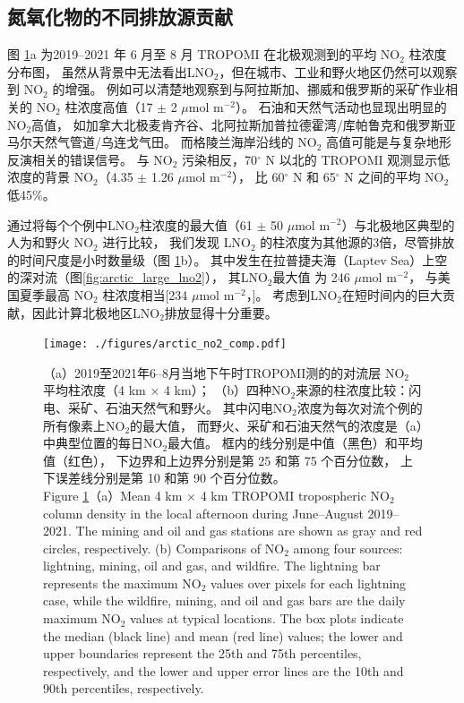 \subsection{氮氧化物的不同排放源贡献}


图 \ref{fig:arctic_no2_comp}a 为2019--2021 年 6 月至 8 月 TROPOMI 在北极观测到的平均 NO$_2$ 柱浓度分布图，
虽然从背景中无法看出LNO$_2$，但在城市、工业和野火地区仍然可以观察到 NO$_2$ 的增强。
例如可以清楚地观察到与阿拉斯加、挪威和俄罗斯的采矿作业相关的 NO$_2$ 柱浓度高值（17 $\pm$ 2 $\mu$mol m$^{-2}$）。
石油和天然气活动也显现出明显的NO$_2$高值，
如加拿大北极麦肯齐谷、北阿拉斯加普拉德霍湾/库帕鲁克和俄罗斯亚马尔天然气管道/乌连戈气田\citep{VanDerA.2020}。
而格陵兰海岸沿线的 NO$_2$ 高值可能是与复杂地形反演相关的错误信号\citep{Hachmeister.2022}。
与 NO$_2$ 污染相反，70$^{\circ}$ N 以北的 TROPOMI 观测显示低浓度的背景 NO$_2$（4.35 $\pm$ 1.26 $\mu$mol m$^{-2}$），
比 60$^{\circ}$ N 和 65$^{\circ}$ N 之间的平均 NO$_2$ 低45\%。

通过将每个个例中LNO$_2$柱浓度的最大值（61 $\pm$ 50 $\mu$mol m$^{-2}$）与北极地区典型的人为和野火 NO$_2$ 进行比较，
我们发现 LNO$_2$ 的柱浓度为其他源的3倍，尽管排放的时间尺度是小时数量级（图 \ref{fig:arctic_no2_comp}b）。
其中发生在拉普捷夫海（Laptev Sea）上空的深对流（图\ref{fig:arctic_large_lno2}），
其LNO$_2$最大值 为 246 $\mu$mol m$^{-2}$，
与美国夏季最高 NO$_2$ 柱浓度相当[234 $\mu$mol m$^{-2}$，\citet{Goldberg.2021a}]。
考虑到LNO$_2$在短时间内的巨大贡献，因此计算北极地区LNO$_2$排放显得十分重要。

\begin{figure}[!htbp]
\centering
\texttt{[image: ./figures/arctic\_no2\_comp.pdf]}
\caption{
（a）2019至2021年6--8月当地下午时TROPOMI测的的对流层 NO$_2$ 平均柱浓度（4 km $\times$ 4 km）；
（b）四种NO$_2$来源的柱浓度比较：闪电、采矿、石油天然气和野火。
其中闪电NO$_2$浓度为每次对流个例的所有像素上NO$_2$的最大值，
而野火、采矿和石油天然气的浓度是（a）中典型位置的每日NO$_2$最大值。
框内的线分别是中值（黑色）和平均值（红色），
下边界和上边界分别是第 25 和第 75 个百分位数，
上下误差线分别是第 10 和第 90 个百分位数。\\
Figure \ref{fig:arctic_no2_comp}（a）Mean 4 km $\times$ 4 km TROPOMI tropospheric NO$_2$ column density in the local afternoon during June--August 2019--2021.
The mining and oil and gas stations are shown as gray and red circles, respectively.
(b) Comparisons of NO$_2$ among four sources: lightning, mining, oil and gas, and wildfire.
The lightning bar represents the maximum NO$_2$ values over pixels for each lightning case,
while the wildfire, mining, and oil and gas bars are the daily maximum NO$_2$ values at typical locations.
The box plots indicate the median (black line) and mean (red line) values; the lower and upper boundaries represent the 25th and 75th percentiles, respectively, and the lower and upper error lines are the 10th and 90th percentiles, respectively.
}
\label{fig:arctic_no2_comp}
\end{figure}

